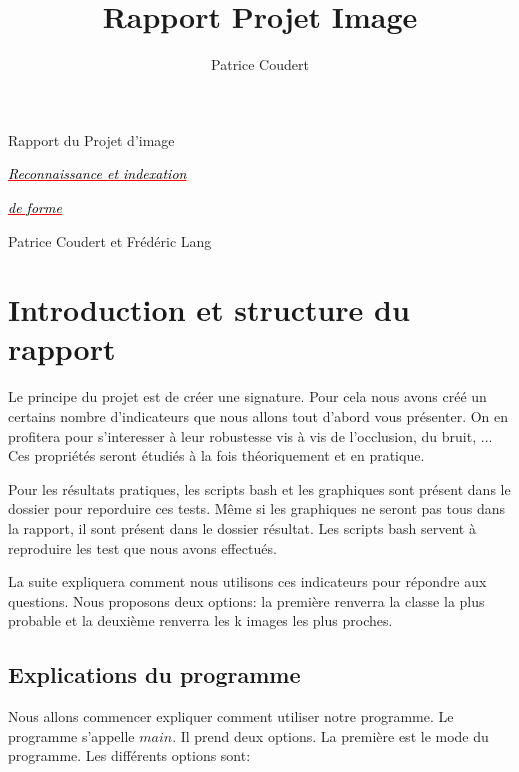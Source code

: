 \documentclass{report}
\title{Rapport Projet Image}
\author{Patrice Coudert}
\newcommand{\TextSoulign}[3]{\emph{\textcolor{#1}{\underline{#2\textcolor{black}{#3}}}}}
\begin{document}
\begin{titlepage}
	\begin{center}
		\vspace{3.5cm}
		\huge{Rapport du Projet d'image}
		\vspace{1cm}
		
		\Huge{\TextSoulign{red}{}{Reconnaissance et indexation}}

		\Huge{\TextSoulign{red}{}{de forme}}
		\vspace{5cm}
		
		\LARGE{Patrice Coudert et Frédéric Lang}
		\vspace{3.5cm}
		
	\end{center}
	
	
	
\end{titlepage}

\tableofcontents

\chapter*{Introduction et structure du rapport}

Le principe du projet est de créer une signature. Pour cela nous avons créé un certains nombre d'indicateurs
que nous allons tout d'abord vous présenter. On en profitera pour s'interesser à leur robustesse vis à vis de l'occlusion, du bruit, ...
Ces propriétés seront étudiés à la fois théoriquement et en pratique.

Pour les résultats pratiques, les scripts bash et les graphiques sont présent dans le dossier pour reporduire ces tests. Même si les graphiques
ne seront pas tous dans la rapport, il sont présent dans le dossier résultat. Les scripts bash servent à reproduire les test que nous 
avons effectués.

La suite expliquera comment nous utilisons ces indicateurs pour répondre aux questions. Nous proposons deux options: la première renverra la classe
la plus probable et la deuxième renverra les k images les plus proches.

\section*{Explications du programme}

Nous allons commencer expliquer comment utiliser notre programme. Le programme s'appelle $main$. Il prend deux options. La première est
le mode du programme. Les différents options sont:
\end{document}
